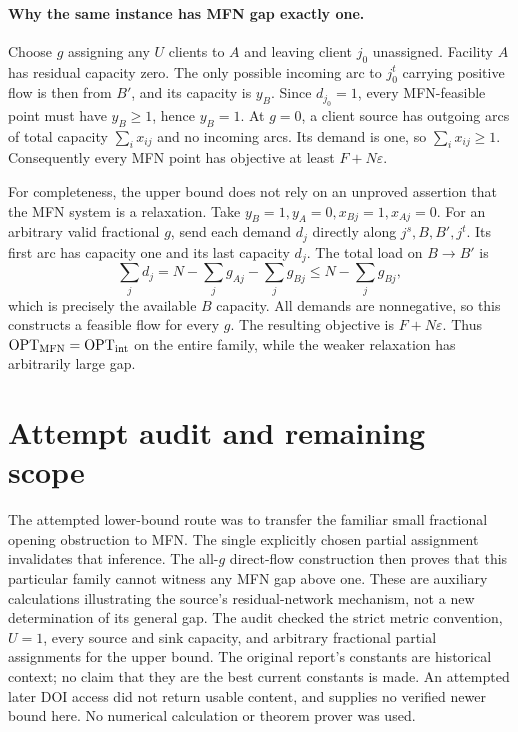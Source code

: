 \documentclass[11pt]{article}
\begin{document}
\paragraph{Why the same instance has MFN gap exactly one.}
Choose $g$ assigning any $U$ clients to $A$ and leaving client $j_0$ unassigned.
Facility $A$ has residual capacity zero. The only possible incoming arc to
$j_0^t$ carrying positive flow is then from $B'$, and its capacity is $y_B$.
Since $d_{j_0}=1$, every MFN-feasible point must have $y_B\ge1$, hence $y_B=1$.
At $g=0$, a client source has outgoing arcs of total capacity $\sum_i x_{ij}$
and no incoming arcs. Its demand is one, so $\sum_i x_{ij}\ge1$.
Consequently every MFN point has objective at least $F+N\varepsilon$.

For completeness, the upper bound does not rely on an unproved assertion
that the MFN system is a relaxation. Take $y_B=1,y_A=0,x_{Bj}=1,x_{Aj}=0$.
For an arbitrary valid fractional $g$, send each demand $d_j$ directly along
$j^s,B,B',j^t$. Its first arc has capacity one and its last capacity $d_j$.
The total load on $B\to B'$ is
\[
\sum_jd_j=N-\sum_jg_{Aj}-\sum_jg_{Bj}
\le N-\sum_jg_{Bj},
\]
which is precisely the available $B$ capacity. All demands are nonnegative,
so this constructs a feasible flow for every $g$. The resulting objective is
$F+N\varepsilon$. Thus $\mathrm{OPT}_{\rm MFN}=\mathrm{OPT}_{\rm int}$
on the entire family, while the weaker relaxation has arbitrarily large gap.

\section{Attempt audit and remaining scope}
The attempted lower-bound route was to transfer the familiar small fractional
opening obstruction to MFN. The single explicitly chosen partial assignment
invalidates that inference. The all-$g$ direct-flow construction then proves
that this particular family cannot witness any MFN gap above one.
These are auxiliary calculations illustrating the source's residual-network
mechanism, not a new determination of its general gap.
The audit checked the strict metric convention, $U=1$, every source and sink
capacity, and arbitrary fractional partial assignments for the upper bound.
The original report's constants are historical context; no claim that they
are the best current constants is made. An attempted later DOI access did not
return usable content, and supplies no verified newer bound here.
No numerical calculation or theorem prover was used.
\end{document}

